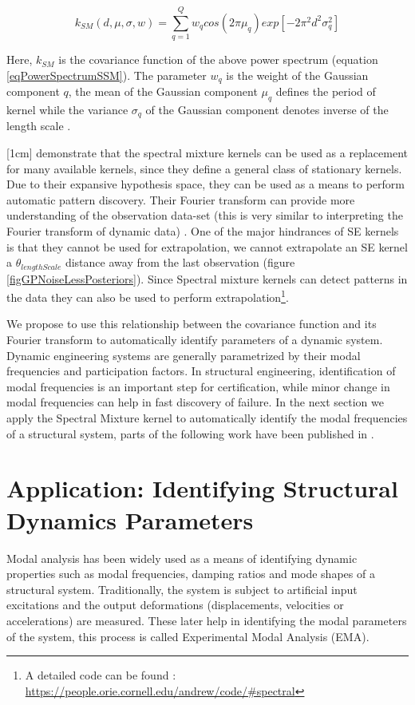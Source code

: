 \begin{equation}\label{eqCovarianceKSM}
k_{SM}(d, \mu, \sigma, w) = \sum_{q=1}^{Q}w_{q}cos(2\pi\mu_{q}) exp[-2\pi^{2}d^{2}\sigma_{q}^2]
\end{equation}

Here, $k_{SM}$ is the covariance function of the above power spectrum (equation \ref{eqPowerSpectrumSSM}). The parameter $w_{q}$ is the weight of the Gaussian component $q$, the mean of the Gaussian component $\mu_{q}$ defines the period of kernel while the variance $\sigma_{q}$ of the Gaussian component denotes inverse of the length scale . 

[1cm]
\cite{wilson2014thesis} demonstrate that the spectral mixture kernels can be used as a replacement for many available kernels, since they define a general class of stationary kernels. Due to their expansive hypothesis space, they can be used as a means to perform automatic pattern discovery. Their Fourier transform can provide more understanding of the observation data-set (this is very similar to interpreting the Fourier transform of dynamic data) \cite{wilson2013gaussian}. One of the major hindrances of SE kernels is that they cannot be used for extrapolation, we cannot extrapolate an SE kernel a $\theta_{lengthScale}$ distance away from the last observation (figure \ref{figGPNoiseLessPosteriors}). Since Spectral mixture kernels can detect patterns in the data they can also be used to perform extrapolation\footnote{A detailed code can be found : \url{https://people.orie.cornell.edu/andrew/code/\#spectral}}. 

We propose to use this relationship between the covariance function and its Fourier transform to automatically identify parameters of a dynamic system. Dynamic engineering systems are generally parametrized by their modal frequencies and participation factors. In structural engineering, identification of modal frequencies is an important step for certification, while minor change in modal frequencies can help in fast discovery of failure. In the next section we apply the Spectral Mixture kernel to automatically identify the modal frequencies of a structural system, parts of the following work have been published in \cite{chiplunkar2017operational}.

\section{Application: Identifying Structural Dynamics Parameters}\label{subSecSMKernelApplication}
Modal analysis has been widely used as a means of identifying dynamic properties such as modal frequencies, damping ratios and mode shapes of a structural system. Traditionally, the system is subject to artificial input excitations and the output deformations (displacements, velocities or accelerations) are measured. These later help in identifying the modal parameters of the system, this process is called Experimental Modal Analysis (EMA). 

